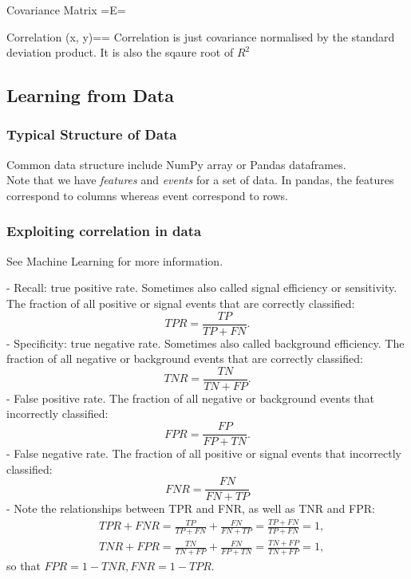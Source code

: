 \documentclass[12pt,a4paper]{article}
\begin{document}
\begin{definition}
    {Covariance Matrix}
    {=E=}{}
\end{definition}
\begin{definition}
    {Correlation}
    {\rho(x, y)==}
    {Correlation is just covariance normalised by the standard deviation product. It is also the sqaure root of $R^2$}
\end{definition}
\subsection{Learning from Data}
\subsubsection{Typical Structure of Data}
Common data structure include NumPy array or Pandas dataframes. \\
Note that we have \textit{features} and \textit{events} for a set of data. In pandas, the features correspond to columns whereas event correspond to rows.
\subsubsection{Exploiting correlation in data}
See Machine Learning for more information.

- Recall: true positive rate. Sometimes also called signal efficiency or sensitivity. The fraction of all positive or signal events that are correctly classified:
$$
T P R=\frac{T P}{T P+F N} .
$$
- Specificity: true negative rate. Sometimes also called background efficiency. The fraction of all negative or background events that are correctly classified:
$$
T N R=\frac{T N}{T N+F P} .
$$
- False positive rate. The fraction of all negative or background events that incorrectly classified:
$$
F P R=\frac{F P}{F P+T N} .
$$
- False negative rate. The fraction of all positive or signal events that incorrectly classified:
$$
F N R=\frac{F N}{F N+T P}
$$
- Note the relationships between TPR and FNR, as well as TNR and FPR:
$$
\begin{aligned}
& T P R+F N R=\frac{T P}{T P+F N}+\frac{F N}{F N+T P}=\frac{T P+F N}{T P+F N}=1, \\
& T N R+F P R=\frac{T N}{T N+F P}+\frac{F N}{F P+T N}=\frac{T N+F P}{T N+F P}=1,
\end{aligned}
$$
so that $F P R=1-T N R, F N R=1-T P R$.
\end{document}
